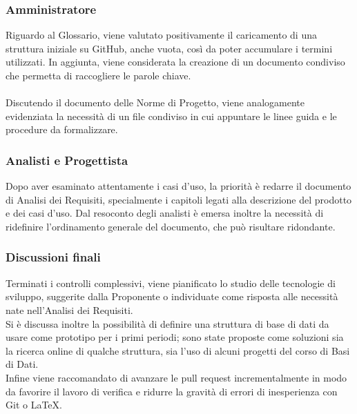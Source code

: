 \subsubsection{Amministratore}
Riguardo al Glossario, viene valutato positivamente il caricamento di una struttura iniziale su GitHub, anche vuota, così da poter accumulare i termini utilizzati. In aggiunta, viene considerata la creazione di un documento condiviso che permetta di raccogliere le parole chiave.\\
\\
Discutendo il documento delle Norme di Progetto, viene analogamente evidenziata la necessità di un file condiviso in cui appuntare le linee guida e le procedure da formalizzare.

\subsubsection{Analisti e Progettista}
Dopo aver esaminato attentamente i casi d'uso, la priorità è redarre il documento di Analisi dei Requisiti, specialmente i capitoli legati alla descrizione del prodotto e dei casi d'uso. Dal resoconto degli analisti è emersa inoltre la necessità di ridefinire l'ordinamento generale del documento, che può risultare ridondante.

\subsubsection{Discussioni finali}
Terminati i controlli complessivi, viene pianificato lo studio delle tecnologie di sviluppo, suggerite dalla Proponente o individuate come risposta alle necessità nate nell'Analisi dei Requisiti.\\
Si è discussa inoltre la possibilità di definire una struttura di base di dati da usare come prototipo per i primi periodi; sono state proposte come soluzioni sia la ricerca online di qualche struttura, sia l'uso di alcuni progetti del corso di Basi di Dati.\\
Infine viene raccomandato di avanzare le pull request incrementalmente in modo da favorire il lavoro di verifica e ridurre la gravità di errori di inesperienza con Git o LaTeX.